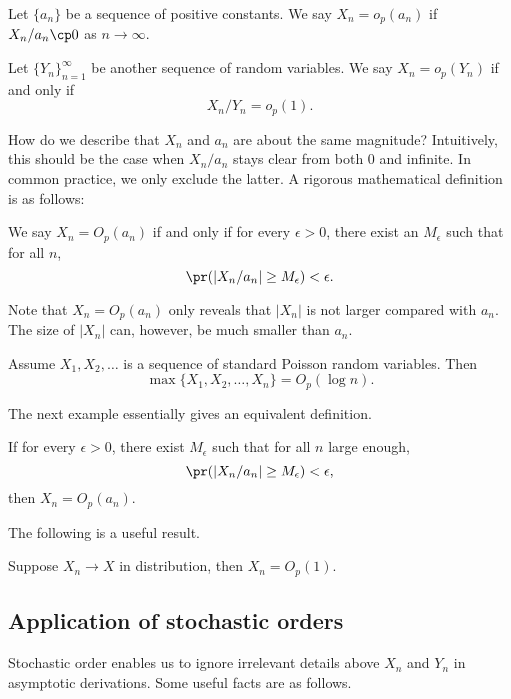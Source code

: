 \begin{defi}
Let $\{a_n\}$ be a sequence of positive constants.
We say $X_n = o_p(a_n)$ if $X_n / a_n  \cp 0$ as $n \to \infty$.

Let $\{Y_n\}_{n=1}^\infty$ be another sequence of random variables.
We say $X_n = o_p(Y_n)$ if and only if 
\[
X_n/Y_n  = o_p(1).
\]
\end{defi}

How do we describe that $X_n$ and $a_n$ are about
the same magnitude? Intuitively, 
this should be the case when ${{X_n}/{a_n}}$
stays clear from both 0 and infinite.
In common practice, we only exclude the latter.
A rigorous mathematical definition is as follows:

\begin{defi}
We say $X_n = O_p(a_n)$ if and only if for every $\epsilon > 0$,
there exist an $M_\epsilon$ such that for all $n$,
\[
\pr ( | X_n / a_n | \geq M_\epsilon) < \epsilon.
\]
\end{defi}

Note that $X_n=O_p(a_n)$ only reveals that $|X_n|$ is not 
larger compared with $a_n$.  The size of $|X_n|$ can, however, be much 
smaller than $a_n$. 

\begin{example}
Assume $X_1, X_2, \ldots$ is a sequence of \iid standard Poisson random variables.
Then
\[
\max \{ X_1, X_2, \ldots, X_n\} = O_p( \log n).
\]
\end{example}

The next example essentially gives an equivalent definition.

\begin{example}
If for every $\epsilon > 0$,
there exist $M_\epsilon$ such that for all $n$ large enough,
\[
\pr ( | X_n / a_n | \geq M_\epsilon) < \epsilon,
\]
then $X_n=O_p(a_n)$.
\end{example}

The following is a useful result.

\begin{example}
Suppose $X_n \to X$ in distribution, then
$X_n=O_p(1)$.
\end{example}


\subsection{Application of stochastic orders}
Stochastic order enables us to ignore 
irrelevant details above $X_n$ and $Y_n$
in asymptotic derivations.
Some useful facts are as follows.

